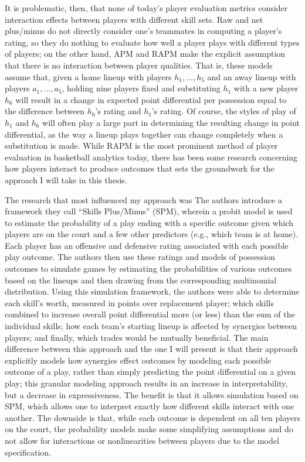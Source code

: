 It is problematic, then, that none of today's player evaluation metrics consider
interaction effects between players with different skill sets. Raw and net
plus/minus do not directly consider one's teammates in computing a player's rating,
so they do nothing to evaluate how well a player plays with different types of
players; on the other hand, APM and RAPM make the explicit assumption that there is
no interaction between player qualities. That is, these models assume that, given a
home lineup with players $h_1, \dots, h_5$ and an away lineup with players $a_1,
\dots, a_5$, holding nine players fixed and substituting $h_1$ with a new player
$h_6$ will result in a change in expected point differential per possession equal to
the difference between $h_6$'s rating and $h_1$'s rating. Of course, the styles of
play of $h_1$ and $h_6$ will often play a large part in determining the resulting
change in point differential, as the way a lineup plays together can change
completely when a substitution is made. While RAPM is the most prominent method of
player evaluation in basketball analytics today, there has been some research
concerning how players interact to produce outcomes that sets the groundwork for the
approach I will take in this thesis.

The research that most influenced my approach was \citet{Maymin} The authors
introduce a framework they call ``Skills Plus/Minus'' (SPM), wherein a probit model
is used to estimate the probability of a play ending with a specific outcome given
which players are on the court and a few other predictors (e.g., which team is at
home). Each player has an offensive and defensive rating associated with each
possible play outcome. The authors then use these ratings and models of possession
outcomes to simulate games by estimating the probabilities of various outcomes based
on the lineups and then drawing from the corresponding multinomial distribution.
Using this simulation framework, the authors were able to determine each skill's
worth, measured in points over replacement player; which skills combined to increase
overall point differential more (or less) than the sum of the individual skills; how
each team’s starting lineup is affected by synergies between players; and finally,
which trades would be mutually beneficial. The main difference between this approach
and the one I will present is that their approach explicitly models how synergies
effect outcomes by modeling each possible outcome of a play, rather than simply
predicting the point differential on a given play; this granular modeling approach
results in an increase in interpretability, but a decrease in expressiveness. The
benefit is that it allows simulation based on SPM, which allows one to interpret
exactly how different skills interact with one another. The downside is that, while
each outcome is dependent on all ten players on the court, the probability models
make some simplifying assumptions and do not allow for interactions or
nonlinearities between players due to the model specification.

